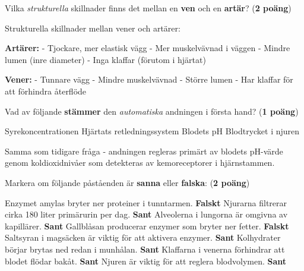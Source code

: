 \documentclass{exam}
\begin{document}
\begin{questions}
\question Vilka \textit{strukturella} skillnader finns det mellan en \textbf{ven} och en \textbf{artär}? (\textbf{2 poäng})
\begin{solution}
Strukturella skillnader mellan vener och artärer:

\textbf{Artärer:}
- Tjockare, mer elastisk vägg
- Mer muskelvävnad i väggen
- Mindre lumen (inre diameter)
- Inga klaffar (förutom i hjärtat)

\textbf{Vener:}
- Tunnare vägg
- Mindre muskelvävnad
- Större lumen
- Har klaffar för att förhindra återflöde
\end{solution}

\question Vad av följande \textbf{stämmer} den \textit{automatiska} andningen i första hand? (\textbf{1 poäng})
\begin{checkboxes}
    \choice Syrekoncentrationen
    \choice Hjärtats retledningssystem
    \correctchoice Blodets pH
    \choice Blodtrycket i njuren
\end{checkboxes}

\begin{solution}
Samma som tidigare fråga - andningen regleras primärt av blodets pH-värde genom koldioxidnivåer som detekteras av kemoreceptorer i hjärnstammen.
\end{solution}

\question Markera om följande påståenden är \textbf{sanna} eller \textbf{falska}: (\textbf{2 poäng})

\begin{oneparchoices}
    \choice Enzymet amylas bryter ner proteiner i tunntarmen. \hfill \textbf{Falskt}
    \vspace{2mm}
    \choice Njurarna filtrerar cirka 180 liter primärurin per dag. \hfill \textbf{Sant}
    \vspace{2mm}
    \choice Alveolerna i lungorna är omgivna av kapillärer. \hfill \textbf{Sant}
    \vspace{2mm}
    \choice Gallblåsan producerar enzymer som bryter ner fetter. \hfill \textbf{Falskt}
    \vspace{2mm}
    \choice Saltsyran i magsäcken är viktig för att aktivera enzymer. \hfill \textbf{Sant}
    \vspace{2mm}
    \choice Kolhydrater börjar brytas ned redan i munhålan. \hfill \textbf{Sant}
    \vspace{2mm}
    \choice Klaffarna i venerna förhindrar att blodet flödar bakåt. \hfill \textbf{Sant}
    \vspace{2mm}
    \choice Njuren är viktig för att reglera blodvolymen. \hfill \textbf{Sant}
\end{oneparchoices}


\end{questions}
\end{document}
